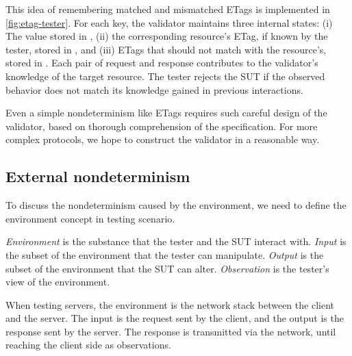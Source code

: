This idea of remembering matched and mismatched ETags is implemented in
\autoref{fig:etag-tester}.  For each key, the validator maintains three internal
states: (i) The value stored in , (ii) the corresponding resource's
ETag, if known by the tester, stored in , and (iii) ETags that
should not match with the resource's, stored in .  Each pair of
request and response contributes to the validator's knowledge of the target
resource.  The tester rejects the SUT if the observed behavior does not match
its knowledge gained in previous interactions.

Even a simple nondeterminism like ETags requires such careful design of the
validator, based on thorough comprehension of the specification.  For more
complex protocols, we hope to construct the validator in a reasonable way.

\subsection{External nondeterminism}
\label{sec:intro-external-nondet}
To discuss the nondeterminism caused by the environment, we need to define the
environment concept in testing scenario.
\begin{definition}
  {\em Environment} is the substance that the tester and the SUT interact with.
  {\em Input} is the subset of the environment that the tester can manipulate.
  {\em Output} is the subset of the environment that the SUT can alter.  {\em
    Observation} is the tester's view of the environment.
\end{definition}
When testing servers, the environment is the network stack between the client
and the server.  The input is the request sent by the client, and the output is
the response sent by the server.  The response is transmitted via the network,
until reaching the client side as observations.

